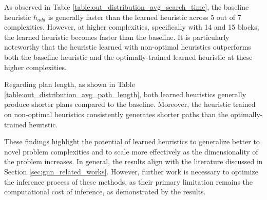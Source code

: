 As observed in Table \ref{table:out_distribution_avg_search_time}, the baseline heuristic $h_{add}$ is generally faster than the learned heuristic across 5 out of 7 complexities. However, at higher complexities, specifically with 14 and 15 blocks, the learned heuristic becomes faster than the baseline. It is particularly noteworthy that the heuristic learned with non-optimal heuristics outperforms both the baseline heuristic and the optimally-trained learned heuristic at these higher complexities.

Regarding plan length, as shown in Table \ref{table:out_distribution_avg_path_length}, both learned heuristics generally produce shorter plans compared to the baseline. Moreover, the heuristic trained on non-optimal heuristics consistently generates shorter paths than the optimally-trained heuristic.

These findings highlight the potential of learned heuristics to generalize better to novel problem complexities and to scale more effectively as the dimensionality of the problem increases. In general, the results align with the literature discussed in Section \ref{sec:gnn_related_works}. However, further work is necessary to optimize the inference process of these methods, as their primary limitation remains the computational cost of inference, as demonstrated by the results.
